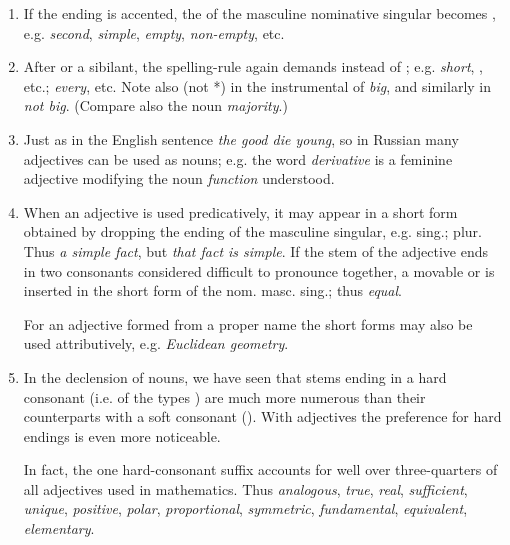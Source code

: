 \begin{enumerate}[label=\roman*)]
\item If the ending is accented, the  of the masculine nominative singular becomes , e.g.  \emph{second},  \emph{simple},  \emph{empty},  \emph{non-empty}, etc.

\item After  or a sibilant, the spelling-rule again demands  instead of ; e.g.  \emph{short}, , etc.;  \emph{every}, etc. Note also  (not *) in the instrumental of  \emph{big}, and similarly in  \emph{not big}. (Compare also the noun  \emph{majority}.)

\item Just as in the English sentence \emph{the good die young}, so in Russian many adjectives can be used as nouns; e.g. the word  \emph{derivative} is a feminine adjective modifying the noun  \emph{function} understood.

\item When an adjective is used predicatively, it may appear in a short form obtained by dropping the ending of the masculine singular, e.g.  sing.;  plur. Thus  \emph{a simple fact}, but  \emph{that fact is simple}. If the stem of the adjective ends in two consonants considered difficult to pronounce together, a movable  or  is inserted in the short form of the nom. masc. sing.; thus  \emph{equal}.

For an adjective formed from a proper name the short forms may also be used attributively, e.g.  \emph{Euclidean geometry}.

\item In the declension of nouns, we have seen that stems ending in a hard consonant (i.e. of the types ) are much more numerous than their counterparts with a soft consonant (). With adjectives the preference for hard endings is even more noticeable.

\begin{sloppypar}
In fact, the one hard-consonant suffix  accounts for well over three-quarters of all adjectives used in mathematics. Thus  \emph{analogous},  \emph{true},  \emph{real},  \emph{sufficient},  \emph{unique},  \emph{positive},  \emph{polar},  \emph{proportional},  \emph{symmetric},  \emph{fundamental},  \emph{equivalent},  \emph{elementary}.
\end{sloppypar}


\end{enumerate}
